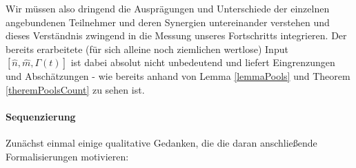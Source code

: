 Wir müssen also dringend die Ausprägungen und Unterschiede der einzelnen angebundenen Teilnehmer und deren Synergien untereinander verstehen und dieses Verständnis zwingend in die Messung unseres Fortschritts integrieren. Der bereits erarbeitete (für sich alleine noch ziemlichen wertlose) Input $\left[ \widehat{n}, \widehat{m}, \Gamma(t) \right]$ ist dabei absolut nicht unbedeutend und liefert Eingrenzungen und Abschätzungen - wie bereits anhand von Lemma \ref{lemmaPools} und Theorem \ref{theremPoolsCount} zu sehen ist.

\vspace{0.3cm}

\paragraph{Sequenzierung} 
\label{sec:eco_zahlen_zustand_wp_advanced_teilnehmer}
\textrm{ }

\vspace{0.3cm}

Zunächst einmal einige qualitative Gedanken, die die daran anschließende Formalisierungen motivieren:

